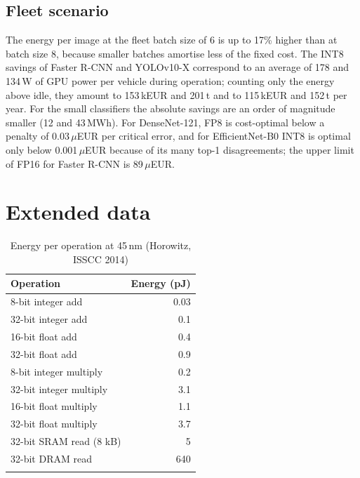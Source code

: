 \documentclass[pdflatex,sn-mathphys-num]{sn-jnl}%
\theoremstyle{thmstyleone}%
\theoremstyle{thmstyletwo}%
\theoremstyle{thmstylethree}%
\begin{document}
\begin{appendices}
\subsection{Fleet scenario}\label{sec:supp-res-aibo}
The energy per image at the fleet batch size of 6 is up to 17\% higher than at batch size 8, because smaller batches amortise less of the fixed cost. The INT8 savings of Faster R-CNN and YOLOv10-X correspond to an average of 178 and 134\,W of GPU power per vehicle during operation; counting only the energy above idle, they amount to 153\,kEUR and 201\,t and to 115\,kEUR and 152\,t per year. For the small classifiers the absolute savings are an order of magnitude smaller (12 and 43\,MWh). For DenseNet-121, FP8 is cost-optimal below a penalty of 0.03\,$\mu$EUR per critical error, and for EfficientNet-B0 INT8 is optimal only below 0.001\,$\mu$EUR because of its many top-1 disagreements; the upper limit of FP16 for Faster R-CNN is 89\,$\mu$EUR.

\section{Extended data}\label{secA1}

\begin{table}[htbp]
\caption{Energy per operation at 45\,nm (Horowitz, ISSCC 2014)}\label{tab:energyref}
\begin{tabular}{@{}lr@{}}
\toprule
Operation & Energy (pJ) \\
\midrule
8-bit integer add & 0.03 \\
32-bit integer add & 0.1 \\
16-bit float add & 0.4 \\
32-bit float add & 0.9 \\
8-bit integer multiply & 0.2 \\
32-bit integer multiply & 3.1 \\
16-bit float multiply & 1.1 \\
32-bit float multiply & 3.7 \\
32-bit SRAM read (8 kB) & 5 \\
32-bit DRAM read & 640 \\
\botrule
\end{tabular}
\end{table}


\end{appendices}
\end{document}
